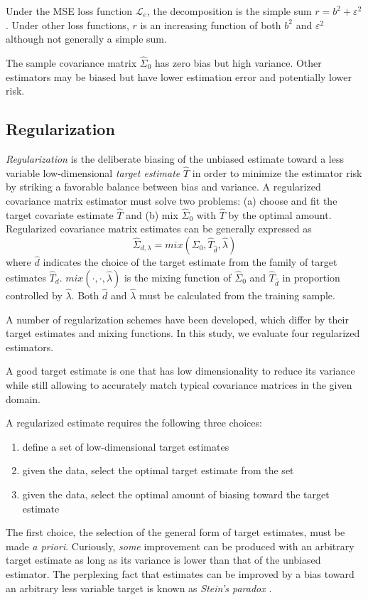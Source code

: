 Under the MSE loss function $\mathcal L_e$, the decomposition is the simple sum $r = b^2 + \varepsilon^2$. 
Under other loss functions, $r$ is an increasing function of both $b^2$ and $\varepsilon^2$ although not generally a simple sum.  

The sample covariance matrix $\hat\Sigma_0$ has zero bias but high variance. Other estimators may be biased but have lower estimation error and potentially lower risk.


\subsection{Regularization}

\emph{Regularization} is the deliberate biasing of the unbiased estimate toward a less variable low-dimensional \emph{target estimate} $\hat T$ in order to minimize the estimator risk by striking a favorable balance between bias and variance.
A regularized covariance matrix estimator must solve two problems: (a) choose and fit the target covariate estimate $\hat T$ and (b) mix $\hat\Sigma_0$ with $\hat T$ by the optimal amount. 
Regularized covariance matrix estimates can be generally expressed as 
\begin{equation}
\hat\Sigma_{d,\lambda} = mix(\Sigma_0,\hat T_{\hat d},\hat\lambda) 
\end{equation}
where $\hat d$ indicates the choice of the target estimate from the family of target estimates $\hat T_d$. $mix(\cdot,\cdot,\hat\lambda)$ is the mixing function of $\hat\Sigma_0$ and $\hat T_{\hat d}$ in proportion controlled by $\hat \lambda$. Both $\hat d$ and $\hat \lambda$ must be calculated from the training sample. 

A number of regularization schemes have been developed, which differ by their target estimates and mixing functions.  In this study, we evaluate four regularized estimators. 

A good target estimate is one that has low dimensionality to reduce its variance while still allowing to accurately match typical covariance matrices in the given domain. 

A regularized estimate requires the following three choices: 
\begin{enumerate}[  1. ]
\item define a set of low-dimensional target estimates
\item given the data, select the optimal target estimate from the set 
\item given the data, select the optimal amount of biasing toward the target estimate
\end{enumerate}
The first choice, the selection of the general form of target estimates, must be made \emph{a priori}.  Curiously, \emph{some} improvement can be produced with an arbitrary target estimate as long as its variance is lower than that of the unbiased estimator.  The perplexing fact that estimates can be improved by a bias toward an arbitrary less variable target is known as \emph{Stein's paradox} \citep{Efron:1977}.  

